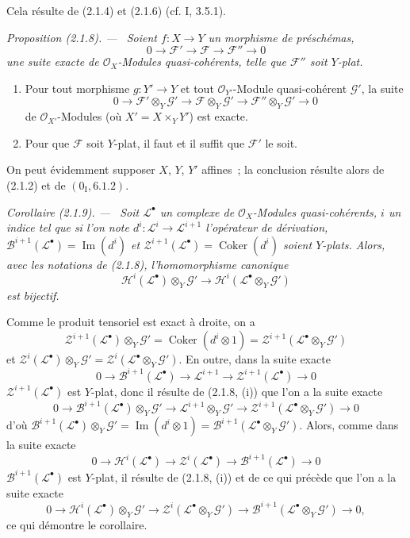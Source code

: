 \documentclass[10pt,oneside]{book}
\newenvironment{proposition}[1][]{%
  \par\medskip\noindent\itshape Proposition (#1). ---\ }{\par}
\newenvironment{corollary}[1][]{%
  \par\medskip\noindent\itshape Corollaire (#1). ---\ }{\par}
\begin{document}
Cela résulte de (2.1.4) et (2.1.6) (cf. I, 3.5.1).

\begin{proposition}[2.1.8]
\label{IV.2.1.8-fr}
Soient $f:X\to Y$ un morphisme de préschémas,
\[
0\to\mathscr F'\to\mathscr F\to\mathscr F''\to0
\]
une suite exacte de $\mathcal O_X$-Modules quasi-cohérents, telle que
$\mathscr F''$ soit $Y$-plat.
\begin{enumerate}
\item[(i)] Pour tout morphisme $g:Y'\to Y$ et tout $\mathcal O_{Y'}$-Module
quasi-cohérent $\mathscr G'$, la suite
\[
0\to\mathscr F'\otimes_Y\mathscr G'\to
\mathscr F\otimes_Y\mathscr G'\to
\mathscr F''\otimes_Y\mathscr G'\to0
\]
de $\mathcal O_{X'}$-Modules (où $X'=X\times_Y Y'$) est exacte.
\item[(ii)] Pour que $\mathscr F$ soit $Y$-plat, il faut et il suffit que
$\mathscr F'$ le soit.
\end{enumerate}
\end{proposition}

On peut évidemment supposer $X$, $Y$, $Y'$ affines~; la conclusion résulte
alors de (2.1.2) et de $(0_{\mathrm I},6.1.2)$.

\begin{corollary}[2.1.9]
\label{IV.2.1.9-fr}
Soit $\mathscr L^\bullet$ un complexe de $\mathcal O_X$-Modules
quasi-cohérents, $i$ un indice tel que si l'on note
$d^i:\mathscr L^i\to\mathscr L^{i+1}$ l'opérateur de dérivation,
$\mathscr B^{i+1}(\mathscr L^\bullet)=\operatorname{Im}(d^i)$ et
$\mathscr Z^{i+1}(\mathscr L^\bullet)=\operatorname{Coker}(d^i)$ soient
$Y$-plats. Alors, avec les notations de (2.1.8), l'homomorphisme canonique
\[
\mathscr H^i(\mathscr L^\bullet)\otimes_Y\mathscr G'
\longrightarrow
\mathscr H^i(\mathscr L^\bullet\otimes_Y\mathscr G')
\]
est bijectif.
\end{corollary}

Comme le produit tensoriel est exact à droite, on a
\[
\mathscr Z^{i+1}(\mathscr L^\bullet)\otimes_Y\mathscr G'
=\operatorname{Coker}(d^i\otimes1)
=\mathscr Z^{i+1}(\mathscr L^\bullet\otimes_Y\mathscr G')
\]
et
$\mathscr Z^i(\mathscr L^\bullet)\otimes_Y\mathscr G'
=\mathscr Z^i(\mathscr L^\bullet\otimes_Y\mathscr G')$. En outre, dans la
suite exacte
\[
0\to\mathscr B^{i+1}(\mathscr L^\bullet)\to\mathscr L^{i+1}
\to\mathscr Z^{i+1}(\mathscr L^\bullet)\to0
\]
$\mathscr Z^{i+1}(\mathscr L^\bullet)$ est $Y$-plat, donc il résulte de
(2.1.8, (i)) que l'on a la suite exacte
\[
0\to\mathscr B^{i+1}(\mathscr L^\bullet)\otimes_Y\mathscr G'
\to\mathscr L^{i+1}\otimes_Y\mathscr G'
\to\mathscr Z^{i+1}(\mathscr L^\bullet\otimes_Y\mathscr G')\to0
\]
d'où
$\mathscr B^{i+1}(\mathscr L^\bullet)\otimes_Y\mathscr G'
=\operatorname{Im}(d^i\otimes1)
=\mathscr B^{i+1}(\mathscr L^\bullet\otimes_Y\mathscr G')$. Alors, comme
dans la suite exacte
\[
0\to\mathscr H^i(\mathscr L^\bullet)\to\mathscr Z^i(\mathscr L^\bullet)
\to\mathscr B^{i+1}(\mathscr L^\bullet)\to0
\]
$\mathscr B^{i+1}(\mathscr L^\bullet)$ est $Y$-plat, il résulte de
(2.1.8, (i)) et de ce qui précède que l'on a la suite exacte
\[
0\to\mathscr H^i(\mathscr L^\bullet)\otimes_Y\mathscr G'
\to\mathscr Z^i(\mathscr L^\bullet\otimes_Y\mathscr G')
\to\mathscr B^{i+1}(\mathscr L^\bullet\otimes_Y\mathscr G')\to0,
\]
ce qui démontre le corollaire.
\end{document}

